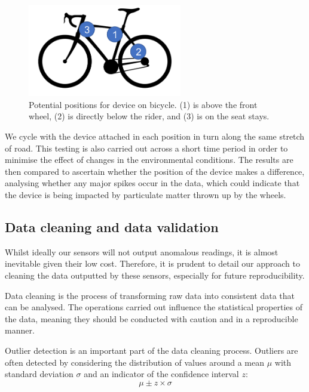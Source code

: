 \documentclass[11pt]{report}
\begin{document}
\begin{figure}[!tb]
\centering
\includegraphics[width=0.6\textwidth]{images/bicycle_positions}
\caption[Device positions on bicycle.]{Potential positions for device on bicycle. (1) is above the front wheel, (2) is directly below the rider, and (3) is on the seat stays.}
\label{bicycle_positions}
\end{figure}

We cycle with the device attached in each position in turn along the same stretch of road. This testing is also carried out across a short time period in order to minimise the effect of changes in the environmental conditions. The results are then compared to ascertain whether the position of the device makes a difference, analysing whether any major spikes occur in the data, which could indicate that the device is being impacted by particulate matter thrown up by the wheels.

\subsection{Data cleaning and data validation}

Whilst ideally our sensors will not output anomalous readings, it is almost inevitable given their low cost. Therefore, it is prudent to detail our approach to cleaning the data outputted by these sensors, especially for future reproducibility.

Data cleaning is the process of transforming raw data into consistent data that can be analysed. The operations carried out influence the statistical properties of the data, meaning they should be conducted with caution and in a reproducible manner.

Outlier detection is an important part of the data cleaning process. Outliers are often detected by considering the distribution of values around a mean $\mu$ with standard deviation $\sigma$ and an indicator of the confidence interval $z$:
\begin{equation}
\mu \pm z \times \sigma
\end{equation}
\end{document}
